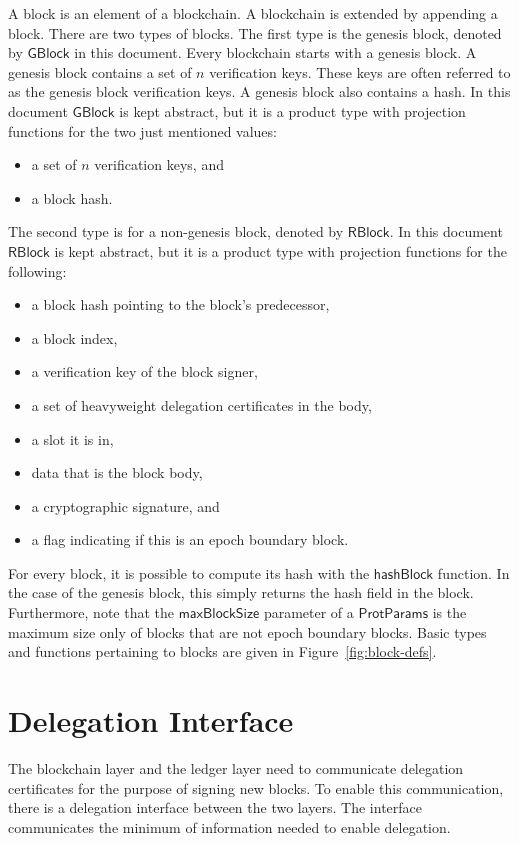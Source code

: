 \documentclass[11pt,a4paper]{article}
\newcommand{\fun}[1]{\mathsf{#1}}
\newcommand{\type}[1]{\mathsf{#1}}
\newcommand{\GBlock}{\type{GBlock}}
\newcommand{\RBlock}{\type{RBlock}}
\newcommand{\ProtParams}{\type{ProtParams}} %
\newcommand{\hashofblockname}{hashBlock}
\newcommand{\maxblocksizename}{maxBlockSize}
\begin{document}
A block is an element of a blockchain.
%
A blockchain is extended by appending a block.
%
There are two types of blocks.
%
The first type is the genesis block, denoted by $\GBlock$ in this document.
%
Every blockchain starts with a genesis block.
%
A genesis block contains a set of $n$ verification keys.
%
These keys are often referred to as the genesis block verification keys.
%
A genesis block also contains a hash.
%
In this document $\GBlock$ is kept abstract, but it is a product type with
projection functions for the two just mentioned values:
%
\begin{itemize}
\item a set of $n$ verification keys, and
\item a block hash.
\end{itemize}

The second type is for a non-genesis block, denoted by $\RBlock$.
%
In this document $\RBlock$ is kept abstract, but it is a product type with
projection functions for the following:
%
\begin{itemize}
\item a block hash pointing to the block's predecessor,
\item a block index,
\item a verification key of the block signer,
\item a set of heavyweight delegation certificates in the body,
\item a slot it is in,
\item data that is the block body,
\item a cryptographic signature, and
\item a flag indicating if this is an epoch boundary block.
\end{itemize}


For every block, it is possible to compute its hash with the
$\fun{\hashofblockname}$ function.
%
In the case of the genesis block, this simply returns the hash field in the
block.
%
Furthermore, note that the $\fun{\maxblocksizename}$ parameter of a
$\ProtParams$ is the maximum size only of blocks that are not epoch boundary
blocks.
%
Basic types and functions pertaining to blocks are given in
Figure~\ref{fig:block-defs}.


\section{Delegation Interface}
\label{sec:del-interface}

The blockchain layer and the ledger layer need to communicate delegation
certificates for the purpose of signing new blocks.
%
To enable this communication, there is a delegation interface between the two
layers.
%
The interface communicates the minimum of information needed to enable
delegation.
\end{document}
